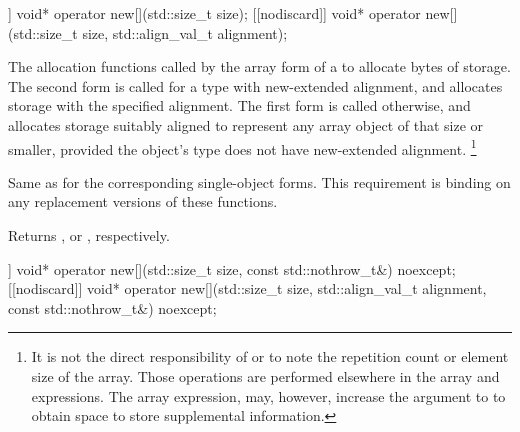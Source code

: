 %
\begin{itemdecl}
[[nodiscard]] void* operator new[](std::size_t size);
[[nodiscard]] void* operator new[](std::size_t size, std::align_val_t alignment);
\end{itemdecl}

\begin{itemdescr}
\pnum
\effects
The
allocation functions
called by the array form of a
to allocate
 bytes of storage.
The second form is called for a type with new-extended alignment,
and allocates storage
with the specified alignment.
The first form is called otherwise,
and allocates storage
suitably aligned to represent any array object of that size or smaller,
provided the object's type does not have new-extended alignment.%
\footnote{It is not the direct responsibility of
or
to note the repetition count or element size of the array.
Those operations are performed elsewhere in the array
and
expressions.
The array
expression, may, however, increase the  argument to
to obtain space to store supplemental information.}

\pnum
\replaceable
{}

\pnum
\required
Same as for
the corresponding single-object forms.
This requirement is binding on any replacement versions of these functions.

\pnum
{}
Returns
,
or
,
respectively.
\end{itemdescr}

%
\begin{itemdecl}
[[nodiscard]] void* operator new[](std::size_t size, const std::nothrow_t&) noexcept;
[[nodiscard]] void* operator new[](std::size_t size, std::align_val_t alignment,
                                   const std::nothrow_t&) noexcept;
\end{itemdecl}


